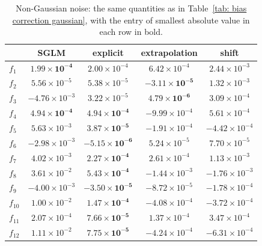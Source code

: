 \begin{table}[htb]
\centering
\small
\begin{tabular}{lcccc}
\toprule
 & SGLM & explicit & extrapolation & shift \\
\midrule
$f_{1}$ & $\boldsymbol{1.99\times10^{-4}}$ & $2.00\times10^{-4}$ & $6.42\times10^{-4}$ & $2.44\times10^{-3}$ \\
$f_{2}$ & $5.56\times10^{-5}$ & $5.38\times10^{-5}$ & $\boldsymbol{-3.11\times10^{-5}}$ & $1.32\times10^{-3}$ \\
$f_{3}$ & $-4.76\times10^{-3}$ & $3.22\times10^{-5}$ & $\boldsymbol{4.79\times10^{-6}}$ & $3.09\times10^{-4}$ \\
$f_{4}$ & $\boldsymbol{4.94\times10^{-4}}$ & $\boldsymbol{4.94\times10^{-4}}$ & $-9.99\times10^{-4}$ & $5.61\times10^{-4}$ \\
$f_{5}$ & $5.63\times10^{-3}$ & $\boldsymbol{3.87\times10^{-5}}$ & $-1.91\times10^{-4}$ & $-4.42\times10^{-4}$ \\
$f_{6}$ & $-2.98\times10^{-3}$ & $\boldsymbol{-5.15\times10^{-6}}$ & $5.24\times10^{-5}$ & $7.70\times10^{-5}$ \\
$f_{7}$ & $4.02\times10^{-3}$ & $\boldsymbol{2.27\times10^{-4}}$ & $2.61\times10^{-4}$ & $1.13\times10^{-3}$ \\
$f_{8}$ & $3.61\times10^{-2}$ & $\boldsymbol{5.43\times10^{-4}}$ & $-1.44\times10^{-3}$ & $-1.76\times10^{-3}$ \\
$f_{9}$ & $-4.00\times10^{-3}$ & $\boldsymbol{-3.50\times10^{-5}}$ & $-8.72\times10^{-5}$ & $-1.78\times10^{-4}$ \\
$f_{10}$ & $1.00\times10^{-2}$ & $\boldsymbol{1.47\times10^{-4}}$ & $-4.08\times10^{-4}$ & $-3.72\times10^{-4}$ \\
$f_{11}$ & $2.07\times10^{-4}$ & $\boldsymbol{7.66\times10^{-5}}$ & $1.37\times10^{-4}$ & $3.47\times10^{-4}$ \\
$f_{12}$ & $1.11\times10^{-2}$ & $\boldsymbol{7.75\times10^{-5}}$ & $-4.24\times10^{-4}$ & $-6.31\times10^{-4}$ \\
\bottomrule
\end{tabular}
\caption{Non-Gaussian noise: the same quantities as in Table~\ref{tab: bias correction gaussian}, with the entry of smallest absolute value in each row in bold.}
\label{tab: bias correction nongaussian}
\end{table}

